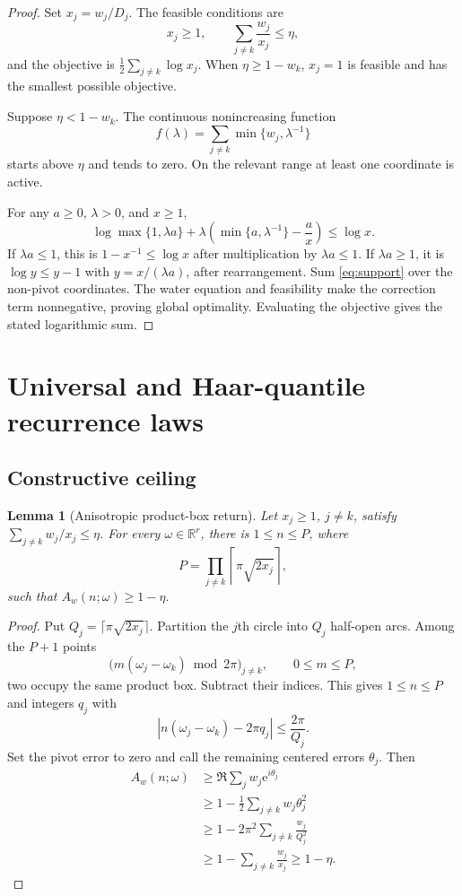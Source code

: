 \documentclass[10pt]{article}
\newtheorem{lemma}[theorem]{Lemma}
\theoremstyle{definition}
\newcommand{\R}{\mathbb R}
\newcommand{\ee}{\mathrm e}
\begin{document}
\begin{proof}
Set \(x_j=w_j/D_j\).  The feasible conditions are
\[
 x_j\geq1,\qquad \sum_{j\ne k}\frac{w_j}{x_j}\leq\eta,
\]
and the objective is \(\frac12\sum_{j\ne k}\log x_j\).
When \(\eta\geq1-w_k\), \(x_j=1\) is feasible and has the smallest possible
objective.

Suppose \(\eta<1-w_k\).  The continuous nonincreasing function
\[
 f(\lambda)=\sum_{j\ne k}\min\{w_j,\lambda^{-1}\}
\]
starts above \(\eta\) and tends to zero.  On the relevant range at least one
coordinate is active.

For any \(a\geq0\), \(\lambda>0\), and \(x\geq1\),
\begin{equation}
 \log\max\{1,\lambda a\}
 +\lambda\left(\min\{a,\lambda^{-1}\}-\frac{a}{x}\right)
 \leq\log x.
\label{eq:support}
\end{equation}
If \(\lambda a\leq1\), this is \(1-x^{-1}\leq\log x\) after
multiplication by \(\lambda a\leq1\).  If \(\lambda a\geq1\), it is
\(\log y\leq y-1\) with \(y=x/(\lambda a)\), after rearrangement.
Sum \eqref{eq:support} over the non-pivot coordinates.  The water equation
and feasibility make the correction term nonnegative, proving global
optimality.  Evaluating the objective gives the stated logarithmic sum.
\end{proof}

\section{Universal and Haar-quantile recurrence laws}

\subsection{Constructive ceiling}

\begin{lemma}[Anisotropic product-box return]
\label{lem:box}
Let \(x_j\geq1\), \(j\ne k\), satisfy
\(\sum_{j\ne k}w_j/x_j\leq\eta\).  For every
\(\omega\in\R^r\), there is \(1\leq n\leq P\), where
\[
 P=\prod_{j\ne k}\left\lceil\pi\sqrt{2x_j}\right\rceil,
\]
such that \(A_w(n;\omega)\geq1-\eta\).
\end{lemma}

\begin{proof}
Put \(Q_j=\lceil\pi\sqrt{2x_j}\rceil\).  Partition the \(j\)th circle into
\(Q_j\) half-open arcs.  Among the \(P+1\) points
\[
 \bigl(m(\omega_j-\omega_k)\bmod2\pi\bigr)_{j\ne k},
 \qquad 0\leq m\leq P,
\]
two occupy the same product box.  Subtract their indices.  This gives
\(1\leq n\leq P\) and integers \(q_j\) with
\[
 |n(\omega_j-\omega_k)-2\pi q_j|\leq\frac{2\pi}{Q_j}.
\]
Set the pivot error to zero and call the remaining centered errors
\(\theta_j\).  Then
\begin{align*}
 A_w(n;\omega)
 &\geq\Re\sum_jw_j\ee^{i\theta_j}\\
 &\geq1-\frac12\sum_{j\ne k}w_j\theta_j^2\\
 &\geq1-2\pi^2\sum_{j\ne k}\frac{w_j}{Q_j^2}\\
 &\geq1-\sum_{j\ne k}\frac{w_j}{x_j}
 \geq1-\eta.
\end{align*}
\end{proof}
\end{document}
